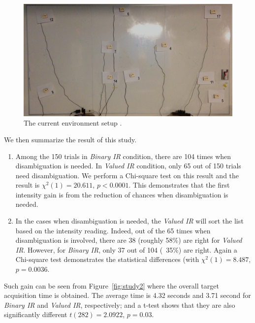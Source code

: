 \begin{figure}[t]
\centering
\includegraphics[width=0.9\columnwidth]{figures/study-layout2.jpg}
\caption{The current environment setup .}
\label{fig:study-layout2}
\end{figure}

We then summarize the result of this study. 
\begin{enumerate}
\item Among the 150 trials in {\em Binary IR} condition, there are 104 times when disambiguation is needed. In {\em Valued IR} condition, only 65 out of 150 trials need disambiguation. We perform a Chi-square test on this result and the result is $\chi^2(1) = 20.611$, $p < 0.0001$.  This demonstrates that the first intensity gain is from the reduction of chances when disambiguation is needed.
\item In the cases when disambiguation is needed, the {\em Valued IR} will sort the list based on the intensity reading. Indeed, out of the 65 times when disambiguation is involved, there are 38 (roughly 58\%) are right for {\em Valued IR}. However, for {\em Binary IR}, only 37 out of 104 (~35\%) are right. Again a Chi-square test demonstrates the statistical differences (with $\chi^2(1) = 8.487$, $p = 0.0036$. 
\end{enumerate}

Such gain can be seen from Figure~\ref{fig:study2} where the overall target acquisition time is obtained. The average time is 4.32 seconds and 3.71 second for {\em Binary IR} and {\em Valued IR}, respectively; and a t-test shows that they are also significantly different $t(282)=2.0922$, $p=0.03$.

